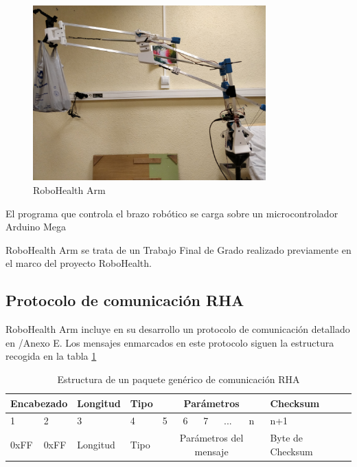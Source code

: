 \begin{figure}[bt]
\centering
\includegraphics[width=0.8\textwidth]{figuras/RHA.png}
\caption{RoboHealth Arm}
\label{fig:RHA}
\end{figure}

El programa que controla el brazo robótico\cite{Heredia2:2018} se carga sobre un microcontrolador Arduino Mega

RoboHealth Arm se trata de un Trabajo Final de Grado\cite{Heredia1:2018} realizado previamente en el marco del proyecto RoboHealth.

\subsection{Protocolo de comunicación RHA}

RoboHealth Arm incluye en su desarrollo un protocolo de comunicación detallado en \cite{Heredia1:2018}/Anexo E. Los mensajes enmarcados en este protocolo siguen la estructura recogida en la tabla \ref{tab:RHAcom}

\begin{table}[H]
\begin{center}
\begin{tabular}{|m{15mm}|m{15mm}|m{15mm}|m{15mm}|m{5mm}|m{5mm}|m{5mm}|m{5mm}|m{5mm}|m{20mm}|}
\hline
\multicolumn{2}{|c|}{\textbf{Encabezado}} & \textbf{Longitud} & \textbf{Tipo} & \multicolumn{5}{|c|}{\textbf{Parámetros}} & \textbf{Checksum}\\
\hline
\hline
1 & 2 & 3 & 4 & 5 & 6 & 7 & ... & n & n+1\\
\hline
0xFF & 0xFF & Longitud & Tipo & \multicolumn{5}{|c|}{Parámetros del mensaje} & Byte de Checksum\\
\hline
\end{tabular}
\end{center}
\caption{Estructura de un paquete genérico de comunicación RHA}
\label{tab:RHAcom}
\end{table}

